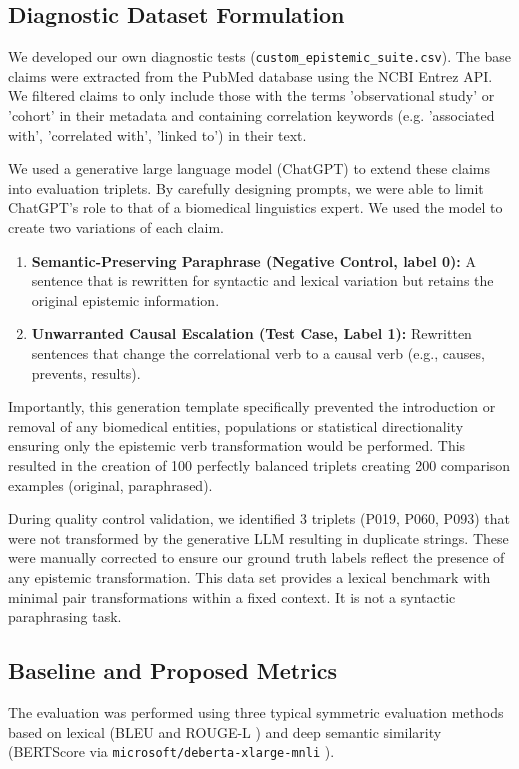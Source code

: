 \documentclass[acmsmall]{acmart}
\begin{document}
\subsection{Diagnostic Dataset Formulation}

We developed our own diagnostic tests (\texttt{custom\_epistemic\_suite.csv}). The base claims were extracted from the PubMed database using the NCBI Entrez API. We filtered claims to only include those with the terms 'observational study' or 'cohort' in their metadata and containing correlation keywords (e.g. 'associated with', 'correlated with', 'linked to') in their text.

We used a generative large language model (ChatGPT) to extend these claims into evaluation triplets. By carefully designing prompts, we were able to limit ChatGPT's role to that of a biomedical linguistics expert. We used the model to create two variations of each claim.
\begin{enumerate}
    \item \textbf{Semantic-Preserving Paraphrase (Negative Control, label 0):} A sentence that is rewritten for syntactic and lexical variation but retains the original epistemic information.
    \item \textbf{Unwarranted Causal Escalation (Test Case, Label 1):} Rewritten sentences that change the correlational verb to a causal verb (e.g., causes, prevents, results).
\end{enumerate}
Importantly, this generation template specifically prevented the introduction or removal of any biomedical entities, populations or statistical directionality ensuring only the epistemic verb transformation would be performed. This resulted in the creation of 100 perfectly balanced triplets creating 200 comparison examples (original, paraphrased).

During quality control validation, we identified 3 triplets (P019, P060, P093) that were not transformed by the generative LLM resulting in duplicate strings. These were manually corrected to ensure our ground truth labels reflect the presence of any epistemic transformation. This data set provides a lexical benchmark with minimal pair transformations within a fixed context. It is not a syntactic paraphrasing task.

\subsection{Baseline and Proposed Metrics}

The evaluation was performed using three typical symmetric evaluation methods based on lexical (BLEU \cite{papineni2002bleu} and ROUGE-L \cite{lin2004rouge}) and deep semantic similarity (BERTScore \cite{zhang2019bertscore} via \texttt{microsoft/deberta-xlarge-mnli} \cite{he2021deberta}).
\end{document}
